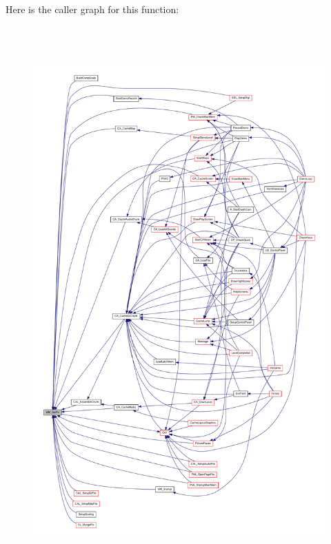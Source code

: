 Here is the caller graph for this function:
\nopagebreak
\begin{figure}[H]
\begin{center}
\leavevmode
\includegraphics[height=600pt]{ID__MM_8H_ab70f353278bae916507eb350c39f4ebb_icgraph}
\end{center}
\end{figure}


